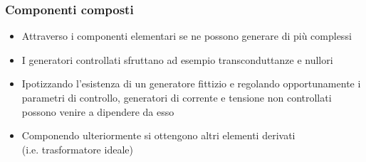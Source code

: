 
\begin{frame}
 \frametitle{Componenti composti}

 \begin{itemize}
  \item<1-> Attraverso i componenti elementari se ne possono generare di più complessi
  \item<2-> I generatori controllati sfruttano ad esempio transconduttanze e nullori
  \item<3-> Ipotizzando l'esistenza di un generatore fittizio e regolando opportunamente i parametri di controllo, generatori di corrente e tensione non controllati possono venire a dipendere da esso
  \item<4-> Componendo ulteriormente si ottengono altri elementi derivati\\ (i.e. trasformatore ideale)
 \end{itemize}


\end{frame}
